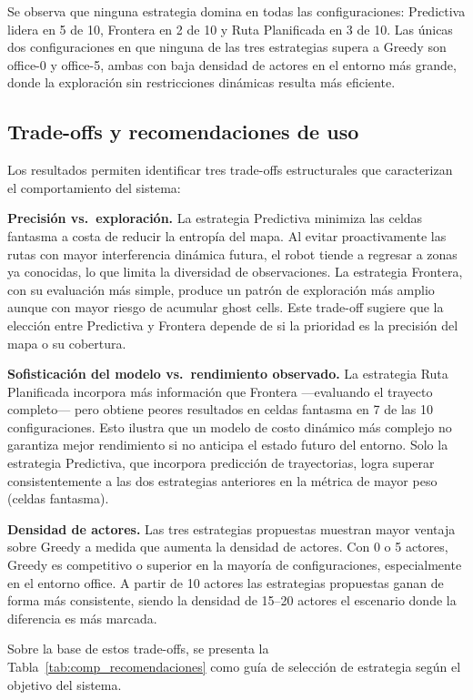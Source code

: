 Se observa que ninguna estrategia domina en todas las configuraciones: Predictiva lidera en 5 de 10, Frontera en 2 de 10 y Ruta Planificada en 3 de 10. Las únicas dos configuraciones en que ninguna de las tres estrategias supera a Greedy son office-0 y office-5, ambas con baja densidad de actores en el entorno más grande, donde la exploración sin restricciones dinámicas resulta más eficiente.

\subsection{Trade-offs y recomendaciones de uso}

Los resultados permiten identificar tres trade-offs estructurales que caracterizan el comportamiento del sistema:

\textbf{Precisión vs.\ exploración.} La estrategia Predictiva minimiza las celdas fantasma a costa de reducir la entropía del mapa. Al evitar proactivamente las rutas con mayor interferencia dinámica futura, el robot tiende a regresar a zonas ya conocidas, lo que limita la diversidad de observaciones. La estrategia Frontera, con su evaluación más simple, produce un patrón de exploración más amplio aunque con mayor riesgo de acumular ghost cells. Este trade-off sugiere que la elección entre Predictiva y Frontera depende de si la prioridad es la precisión del mapa o su cobertura.

\textbf{Sofisticación del modelo vs.\ rendimiento observado.} La estrategia Ruta Planificada incorpora más información que Frontera —evaluando el trayecto completo— pero obtiene peores resultados en celdas fantasma en 7 de las 10 configuraciones. Esto ilustra que un modelo de costo dinámico más complejo no garantiza mejor rendimiento si no anticipa el estado futuro del entorno. Solo la estrategia Predictiva, que incorpora predicción de trayectorias, logra superar consistentemente a las dos estrategias anteriores en la métrica de mayor peso (celdas fantasma).

\textbf{Densidad de actores.} Las tres estrategias propuestas muestran mayor ventaja sobre Greedy a medida que aumenta la densidad de actores. Con 0 o 5 actores, Greedy es competitivo o superior en la mayoría de configuraciones, especialmente en el entorno office. A partir de 10 actores las estrategias propuestas ganan de forma más consistente, siendo la densidad de 15--20 actores el escenario donde la diferencia es más marcada.

Sobre la base de estos trade-offs, se presenta la Tabla~\ref{tab:comp_recomendaciones} como guía de selección de estrategia según el objetivo del sistema.

